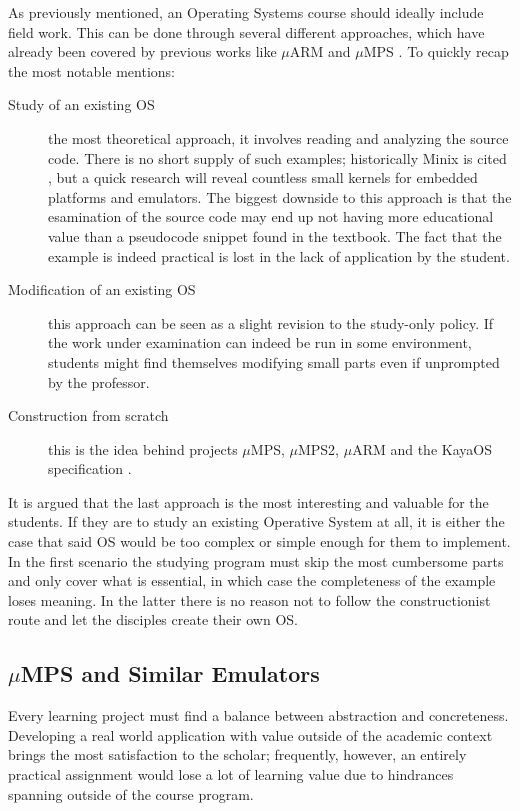 \documentclass[12pt,a4paper,openright,twoside]{report}
\begin{document}
As previously mentioned, an Operating Systems course should ideally include
field work. This can be done through several different approaches, which
have already been covered by previous works like $\mu$ARM and $\mu$MPS
\cite{tesijonjic} \cite{tesimelletti}.
To quickly recap the most notable mentions:
\begin{description}
    \item[Study of an existing OS] the most theoretical approach, it involves
        reading and analyzing the source code. There is no short supply of such
        examples; historically Minix is cited \cite{minix}, but a quick research
        will reveal countless small kernels for embedded platforms and emulators.
        The biggest downside to this approach is that the esamination of the source
        code may end up not having more educational value than a pseudocode snippet
        found in the textbook. The fact that the example is indeed practical is 
        lost in the lack of application by the student.
    \item[Modification of an existing OS] this approach can be seen as a slight
        revision to the study-only policy. If the work under examination can indeed
        be run in some environment, students might find themselves modifying small
        parts even if unprompted by the professor.
    \item[Construction from scratch] this is the idea behind projects $\mu$MPS, 
        $\mu$MPS2, $\mu$ARM and the KayaOS specification \cite{davolimorsiani}.
\end{description}

It is argued that the last approach is the most interesting and valuable for 
the students. If they are to study an existing Operative System at all, it is
either the case that said OS would be too complex or simple enough for them 
to implement. In the first scenario the studying program must skip the most cumbersome
parts and only cover what is essential, in which case the completeness 
of the example loses meaning. In the latter there is no reason not to follow 
the constructionist route and let the disciples create their own OS.

\subsection{$\mu$MPS and Similar Emulators}
Every learning project must find a balance between abstraction and concreteness.
Developing a real world application with value outside of the academic context
 brings the most satisfaction to the scholar; frequently, however, an entirely
 practical assignment would lose a lot of learning value due to hindrances
 spanning outside of the course program.
 
\end{document}
